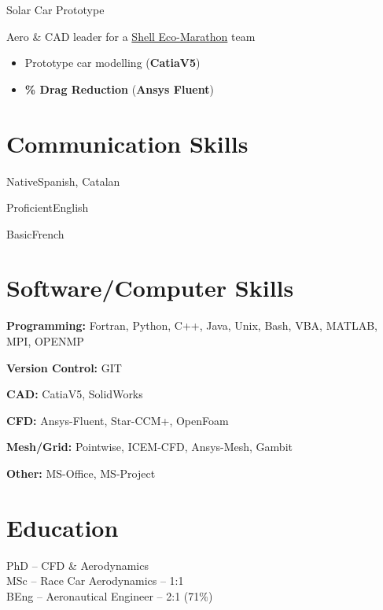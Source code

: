 \documentclass[fontsize=10pt]{tccv}
\begin{document}
\begin{eventlist}
     {Solar Car Prototype}

Aero \& CAD leader for a
\href{http://www.shell.com/global/environment-society/ecomarathon.html}{Shell
Eco-Marathon} team
\begin{itemize}
\itemsep -2pt
	\item Prototype car modelling (\textbf{CatiaV5})
	\item \textbf{\% Drag Reduction} (\textbf{Ansys Fluent})
\end{itemize}
\end{eventlist}

\vspace{-20pt}
\section{Communication Skills}
\begin{factlist}
\item{Native}{Spanish, Catalan}
\item{Proficient}{English}
\item{Basic}{French}
\end{factlist}

\vspace{-20pt}
\section{Software/Computer Skills}
\begin{factlist}
\item{\textbf{Programming:}}
     {Fortran, Python, C++, Java, Unix, Bash, VBA, MATLAB, MPI, OPENMP}
\item{\textbf{Version Control:}}
     {GIT}
\item{\textbf{CAD:}}
     {CatiaV5, SolidWorks}
\item{\textbf{CFD:}}
     {Ansys-Fluent, Star-CCM+, OpenFoam}
\item{\textbf{Mesh/Grid:}}
     {Pointwise, ICEM-CFD, Ansys-Mesh, Gambit}
\item{\textbf{Other:}}
     {MS-Office, MS-Project}
\end{factlist}


\vspace{-20pt}
\section{Education}
\begin{eventlist}
     	{\normalsize{PhD -- CFD \& Aerodynamics}} \\

\vspace{-8pt}
     	{\normalsize{MSc -- Race Car Aerodynamics -- 1:1}} \\

\vspace{-8pt}
	{\normalsize{BEng -- Aeronautical Engineer -- 2:1 (71\%)}}
\end{eventlist}
\end{document}

